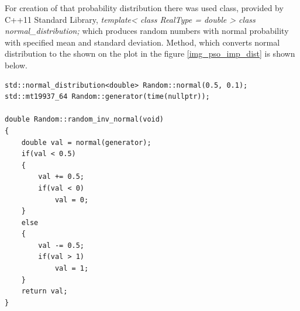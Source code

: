 For creation of that probability distribution there was used class, provided by C++11 Standard Library, 
\textit{template< class RealType = double > class normal\_distribution;} which produces random numbers with normal probability
with specified mean and standard deviation. Method, which converts normal distribution to the shown on the plot in the figure \ref{img_pso_imp_dist} 
is shown below.

\begin{lstlisting}
std::normal_distribution<double> Random::normal(0.5, 0.1);
std::mt19937_64 Random::generator(time(nullptr));

double Random::random_inv_normal(void)
{
    double val = normal(generator);
    if(val < 0.5)
    {
        val += 0.5;
        if(val < 0)
            val = 0;
    }
    else
    {
        val -= 0.5;
        if(val > 1)
            val = 1;
    }
    return val;
}
\end{lstlisting}